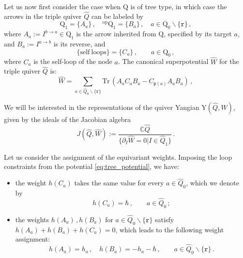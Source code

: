 \documentclass[12pt,a4paper]{article}
\renewcommand{\(}{\left(}
\renewcommand{\)}{\right)}
\renewcommand{\(}{\left(}
\renewcommand{\)}{\right)}
\begin{document}
\medskip

Let us now first consider the case when $\mathrm{Q}$ is of tree type, in which case the arrows in the triple quiver $\widehat{Q}$ can be labeled by 
\begin{equation}\label{eq:triple_notation}
\mathrm{Q}_1=\{A_a\}\,, \quad {}^{\textrm{op}}\mathrm{Q}_1=\{B_a\}\,, \quad a\in \mathrm{Q}_0\backslash\{\mathtt{r}\}\,,
\end{equation}
where $A_a:=I^{b\rightarrow a}\in\textrm{Q}_1$ is the arrow inherited from $\textrm{Q}$, specified by its target $a$, and $B_a:=I^{a\rightarrow b}$ is its reverse, and 
\begin{equation}
\{\mathrm{self\ loops}\}=\{C_a\}\,,\qquad a\in\textrm{Q}_0\,,
\end{equation}
where $C_a$ is the self-loop of the node $a$.
The canonical superpotential $\widehat{W}$ for the triple quiver $\widehat{Q}$ is:
\begin{equation}\label{eq:tree_potential}
\widehat{W}=\sum_{a\in \widehat{Q}_0\backslash \{\mathtt{r}\}}\mathrm{Tr}\,(A_aC_aB_a-C_{\mathfrak{p}(a)}A_aB_a)\,,
\end{equation}

We will be interested in the representations of the quiver Yangian Y$(\widehat{Q},\widehat{W})$, given by the ideals of the Jacobian algebra 
\begin{equation}
J(\widehat{Q},\widehat{W}) :=\frac{\mathbb{C}\widehat{Q}}{\{\partial_{I}\widehat{W}=0|I\in \widehat{Q}_1\}}   \,.
\end{equation}




Let us consider the assignment of the equivariant weights. 
Imposing the loop constraints from the potential \eqref{eq:tree_potential}, we have:
\begin{itemize}
\item the weight $h(C_a)$ takes the same value for every $a\in\widehat{Q}_0$, which we denote by
\begin{equation}
h(C_a)=\hbar\,,\qquad a\in \widehat{Q}_0\,;
\end{equation}
\item the weights $h(A_a)\,,h(B_a)$ for $a\in \widehat{Q}_0\backslash\{\mathtt{r}\}$ satisfy $h(A_a)+h(B_a)+h(C_a)=0$, which leads to the following weight assignment:
\begin{equation}\label{eq:weight_AB}
h(A_a)=h_a\,,\quad h(B_a)=-h_a-\hbar \,,\qquad a\in \widehat{Q}_0\backslash\{\mathtt{r}\}\,.
\end{equation}
\end{itemize}
\end{document}
